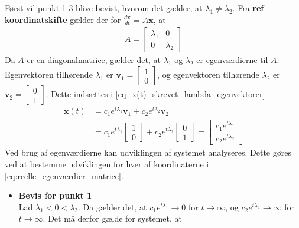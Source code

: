 \begin{bev} \textbf{} %
\newline
Først vil punkt 1-3 blive bevist, hvorom det gælder, at $\lambda_1 \neq \lambda_2$. Fra \textbf{ref koordinatskifte} gælder der for $\frac{d\textbf{x}}{dt} = A\textbf{x}$, at
    \begin{align*}A=
        \begin{bmatrix}
        \lambda_1 & 0 \\
        0 & \lambda_2
        \end{bmatrix}
    \end{align*}
    Da $A$ er en diagonalmatrice, gælder det, at $\lambda_1$ og $\lambda_2$ er egenværdierne til $A$. Egenvektoren tilhørende $\lambda_1$ er $\textbf{v}_1 = \begin{bmatrix} 1 \\0\end{bmatrix}$, og egenvektoren tilhørende $\lambda_2$ er $\textbf{v}_2 = \begin{bmatrix} 0 \\1\end{bmatrix}$. Dette indsættes i \eqref{eq_x(t)_skrevet_lambda_egenvektorer}.
    \begin{align}
    \textbf{x}(t) &= c_1e^{t\lambda_1}\textbf{v}_1 + c_2e^{t\lambda_2}\textbf{v}_2 \nonumber \\
    &= c_1e^{t\lambda_1}\begin{bmatrix} 1 \\0\end{bmatrix} + c_2e^{t\lambda_2}\begin{bmatrix} 0 \\1\end{bmatrix}= \begin{bmatrix} c_1e^{t\lambda_1} \\ c_2e^{t\lambda_2}\end{bmatrix}\label{eq:reelle_egenværdier_matrice}
    \end{align}
    Ved brug af egenværdierne kan udviklingen af systemet analyseres. Dette gøres ved at bestemme udviklingen for hver af koordinaterne i \eqref{eq:reelle_egenværdier_matrice}.
\begin{itemize}
    \item [] \textbf{Bevis for punkt 1} \\
    Lad $\lambda_1 < 0 < \lambda_2$. Da gælder det, at $c_1e^{t\lambda_1} \to 0$ for $t\to \infty$, og $c_2e^{t\lambda_2} \to \infty$ for $t \to \infty$. Det må derfor gælde for systemet, at 
    \begin{align*}

\end{align*}
\end{itemize}
\end{bev}
